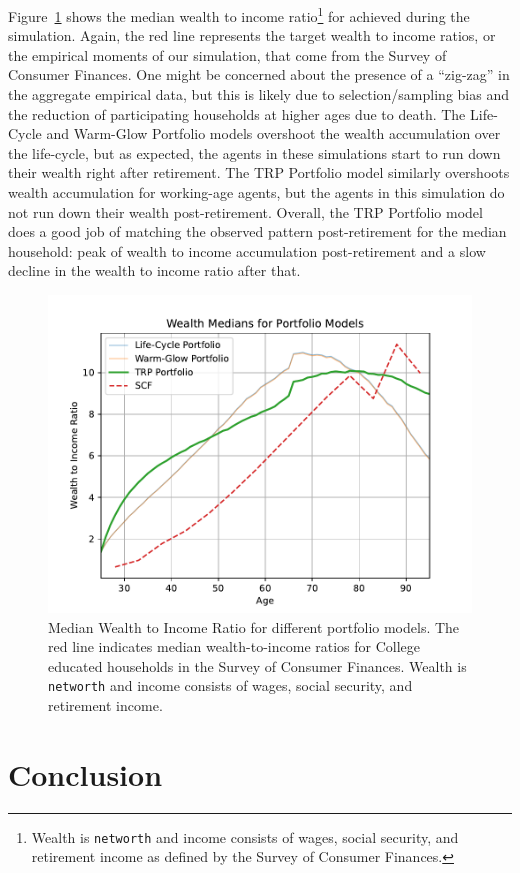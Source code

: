 \documentclass{article}
\begin{document}
Figure~\ref{medwealth} shows the median wealth to income ratio\footnote{Wealth is \texttt{networth} and income consists of wages, social security, and retirement income as defined by the Survey of Consumer Finances.} for achieved during the simulation.
Again, the red line represents the target wealth to income ratios, or the empirical moments of our simulation, that come from the Survey of Consumer Finances.
One might be concerned about the presence of a ``zig-zag'' in the aggregate empirical data, but this is likely due to selection/sampling bias and the reduction of participating households at higher ages due to death.
The Life-Cycle and Warm-Glow Portfolio models overshoot the wealth accumulation over the life-cycle, but as expected, the agents in these simulations start to run down their wealth right after retirement.
The TRP Portfolio model similarly overshoots wealth accumulation for working-age agents, but the agents in this simulation do not run down their wealth post-retirement.
Overall, the TRP Portfolio model does a good job of matching the observed pattern post-retirement for the median household: peak of wealth to income accumulation post-retirement and a slow decline in the wealth to income ratio after that.

\begin{figure}[!htbp]
\centering
\includegraphics[width=0.7\linewidth]{files/median_wealth-d1d3ba30e1007068b9011bcb3913c901.pdf}
\caption[]{Median Wealth to Income Ratio for different portfolio models. The red line indicates median wealth-to-income ratios for College educated households in the Survey of Consumer Finances. Wealth is \texttt{networth} and income consists of wages, social security, and retirement income.}
\label{medwealth}
\end{figure}

\section{Conclusion}
\end{document}
